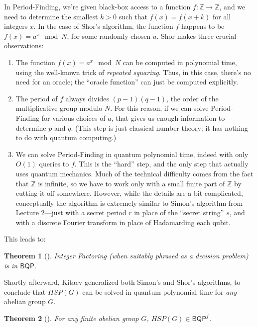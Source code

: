 \documentclass[11pt]{report}
\theoremstyle{plain}
\newtheorem{theorem}{Theorem}[section]
\theoremstyle{definition}
\newcommand{\Z}{{\mathbb Z}}
\begin{document}
In Period-Finding, we're given black-box access to a function $f:\Z \rightarrow \Z$, and we need to determine the smallest $k>0$ such that $f(x)=f(x+k)$ for all integers $x$. In the case of Shor's algorithm, the function $f$ happens to be $f(x)=a^x \mod N$, for some randomly chosen $a$. Shor makes three crucial observations:

\begin{enumerate}
\item[(1)] The function $f(x)=a^x \mod N$ can be computed in polynomial time, using the well-known trick of {\em repeated squaring}. Thus, in this case,
there's no need for an oracle; the ``oracle function'' can just be computed explicitly.
\item[(2)] The period of $f$ always divides $(p-1)(q-1)$, the order of the multiplicative group modulo $N$. For this reason, if we can solve Period-Finding for various choices of $a$, that gives us enough information to determine $p$ and $q$. (This step is just classical number theory; it has nothing to do with quantum computing.)
\item[(3)] We can solve Period-Finding in quantum polynomial time, indeed with only $O(1)$ queries to $f$. This is the ``hard'' step, and the only step that actually uses quantum mechanics. Much of the technical difficulty comes from the fact that $\Z$ is infinite, so we have to work only with a small
finite part of $\Z$ by cutting it off somewhere. However, while the details are a bit complicated, conceptually the algorithm is extremely similar to Simon's algorithm from Lecture 2---just with a secret period $r$ in place of the ``secret string'' $s$, and with a discrete Fourier transform in place of Hadamarding each qubit.
\end{enumerate}

This leads to:

\begin{theorem}[\cite{shor}]
Integer Factoring (when suitably phrased as a decision problem) is in $\mathsf{BQP}$.
\end{theorem}


Shortly afterward, Kitaev generalized both Simon's and Shor's algorithms, to conclude that $HSP(G)$ can be solved in quantum polynomial time for {\em any} abelian group $G$.

\begin{theorem}[\cite{kitaev:meas}]
For any finite abelian group $G$, $HSP(G) \in \mathsf{BQP}^f$.
\end{theorem}
\end{document}
